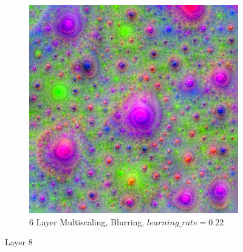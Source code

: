 \begin{figure}
\begin{subfigure}[t]{0.31\textwidth}
    \end{subfigure}
    \hfill
    \begin{subfigure}[t]{0.31\textwidth}
        \captionsetup{justification=centering}
        \centering
        \includegraphics[width=.7\linewidth]{figuras/feat_vis/experiments/intermediary/l8/random_image_pl6_lr2.2e-1_layer17.png}
        \caption{6 Layer Multiscaling, Blurring, \(learning\_rate = 0.22\)}
    \end{subfigure}

    \caption{Layer 8}
    \label{fig:layer_8}
\end{figure}



